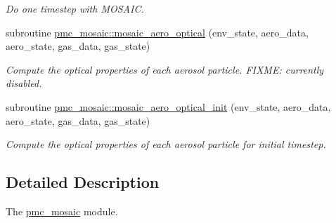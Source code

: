 \begin{DoxyCompactItemize}
\begin{DoxyCompactList}\small\item\em Do one timestep with M\+O\+S\+A\+IC. \end{DoxyCompactList}\item 
subroutine \mbox{\hyperlink{namespacepmc__mosaic_a61a35578a797d028e4b5ee2287400a32}{pmc\+\_\+mosaic\+::mosaic\+\_\+aero\+\_\+optical}} (env\+\_\+state, aero\+\_\+data, aero\+\_\+state, gas\+\_\+data, gas\+\_\+state)
\begin{DoxyCompactList}\small\item\em Compute the optical properties of each aerosol particle. F\+I\+X\+ME\+: currently disabled. \end{DoxyCompactList}\item 
subroutine \mbox{\hyperlink{namespacepmc__mosaic_ad8eceb54892d3b14dd765db53d260d63}{pmc\+\_\+mosaic\+::mosaic\+\_\+aero\+\_\+optical\+\_\+init}} (env\+\_\+state, aero\+\_\+data, aero\+\_\+state, gas\+\_\+data, gas\+\_\+state)
\begin{DoxyCompactList}\small\item\em Compute the optical properties of each aerosol particle for initial timestep. \end{DoxyCompactList}\end{DoxyCompactItemize}


\subsection{Detailed Description}
The \mbox{\hyperlink{namespacepmc__mosaic}{pmc\+\_\+mosaic}} module. 

